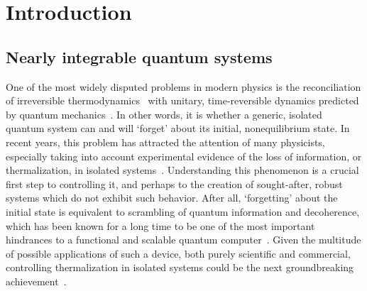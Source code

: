 \chapter{Introduction\label{chap:intro}}
\thispagestyle{chapterBeginStyle}

\section{Nearly integrable quantum systems}
One of the most widely disputed problems in modern physics is the reconciliation
of irreversible thermodynamics~\autocite{Huang1987, Feynman2018}
with unitary, time-reversible dynamics predicted by quantum mechanics~\autocite{Landau1976, Sakurai2017}.
In other words, it is whether a generic, isolated quantum system can and will `forget' about its
initial, nonequilibrium state. In recent years, this problem has attracted the attention of many physicists,
especially taking into account experimental evidence of the loss of information, or thermalization, in isolated
systems~\autocite{Trotzky2012, Rigol2012, Rigol2008, Hung2010, Hofferberth2007}. Understanding this phenomenon is a crucial first step to
controlling it, and perhaps to the creation of sought-after, robust systems which do not exhibit such
behavior. After all, `forgetting' about the initial state is equivalent to scrambling of quantum information
and decoherence, which has been known for a long time to be one of the most important hindrances
to a functional and scalable quantum computer~\autocite{Shor1995, Lewis-Swan2019}. Given the multitude
of possible applications of such a device, both purely scientific and commercial, controlling thermalization
in isolated systems could be the next groundbreaking achievement~\autocite{MacQuarrie2020}.

